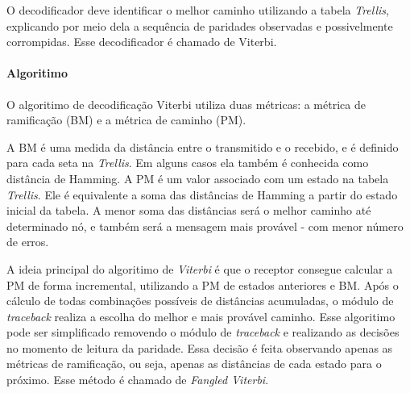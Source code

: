 	O decodificador deve identificar o melhor caminho utilizando a tabela \textit{Trellis}, explicando por meio dela a sequência de paridades observadas e possivelmente corrompidas. Esse decodificador é chamado de Viterbi.
	
	\paragraph{Algoritimo}
	
	O algoritimo de decodificação Viterbi utiliza duas métricas: a métrica de ramificação (BM) e a métrica de caminho (PM). 
	
	A BM é uma medida da distância entre o transmitido e o recebido, e é definido para cada seta na \textit{Trellis}. Em alguns casos ela também é conhecida como distância de Hamming. A PM é um valor associado com um estado na tabela \textit{Trellis}. Ele é equivalente a soma das distâncias de Hamming a partir do estado inicial da tabela. A menor soma das distâncias será o melhor caminho até determinado nó, e também será a mensagem mais provável - com menor número de erros.
	
	A ideia principal do algoritimo de \textit{Viterbi} é que o receptor consegue calcular a PM de forma incremental, utilizando a PM de estados anteriores e BM. Após o cálculo de todas combinações possíveis de distâncias acumuladas, o módulo de \textit{traceback} realiza a escolha do melhor e mais provável caminho. Esse algoritimo pode ser simplificado removendo o módulo de \textit{traceback} e realizando as decisões no momento de leitura da paridade. Essa decisão é feita observando apenas as métricas de ramificação, ou seja, apenas as distâncias de cada estado para o próximo. Esse método é chamado de \textit{Fangled Viterbi}.
	

	
